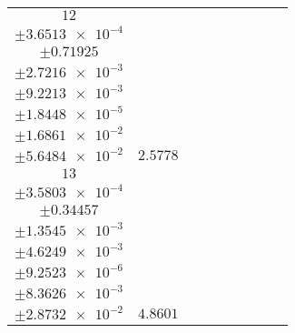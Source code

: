 \documentclass[8pt]{article}
\begin{document}
\begin{longtable}[l]{c c c c c c c c c}
$\num{12}$ & \begin{tabular}[c]{@{}c@{}}$\num{2.9668e-2}$ \\ $\pm\num{3.6513e-4}$\end{tabular} & \begin{tabular}[c]{@{}c@{}}$\num{-0.20158}$ \\ $\pm\num{0.71925}$\end{tabular} & \begin{tabular}[c]{@{}c@{}}$\num{0.90973}$ \\ $\pm\num{2.7216e-3}$\end{tabular} & \begin{tabular}[c]{@{}c@{}}$\num{2.1444e+3}$ \\ $\pm\num{9.2213e-3}$\end{tabular} & \begin{tabular}[c]{@{}c@{}}$\num{4.2899}$ \\ $\pm\num{1.8448e-5}$\end{tabular} & \begin{tabular}[c]{@{}c@{}}$\num{1.1585}$ \\ $\pm\num{1.6861e-2}$\end{tabular} & \begin{tabular}[c]{@{}c@{}}$\num{4.1458}$ \\ $\pm\num{5.6484e-2}$\end{tabular} & $\num{2.5778}$\\
$\num{13}$ & \begin{tabular}[c]{@{}c@{}}$\num{6.0381e-2}$ \\ $\pm\num{3.5803e-4}$\end{tabular} & \begin{tabular}[c]{@{}c@{}}$\num{8.797e-3}$ \\ $\pm\num{0.34457}$\end{tabular} & \begin{tabular}[c]{@{}c@{}}$\num{4.2321}$ \\ $\pm\num{1.3545e-3}$\end{tabular} & \begin{tabular}[c]{@{}c@{}}$\num{2.1477e+3}$ \\ $\pm\num{4.6249e-3}$\end{tabular} & \begin{tabular}[c]{@{}c@{}}$\num{4.2966}$ \\ $\pm\num{9.2523e-6}$\end{tabular} & \begin{tabular}[c]{@{}c@{}}$\num{1.1762}$ \\ $\pm\num{8.3626e-3}$\end{tabular} & \begin{tabular}[c]{@{}c@{}}$\num{4.2265}$ \\ $\pm\num{2.8732e-2}$\end{tabular} & $\num{4.8601}$\\

\end{longtable}
\end{document}
